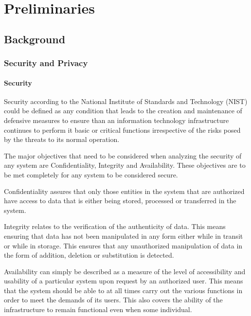 \chapter{Preliminaries}
\label{chap:preliminaries}

\section{Background}

\subsection{Security and Privacy}

\subsubsection*{Security}
Security according to the National Institute of Standards and Technology (NIST) \cite{Kissel2013} could be defined as any condition that leads to the creation and maintenance of defensive measures to ensure than an information technology infrastructure continues to perform it basic or critical functions irrespective of the risks posed by the threats to its normal operation.

The major objectives that need to be considered when analyzing the security of any system are Confidentiality, Integrity and Availability. These objectives are to be met completely for any system to be considered secure.

Confidentiality \cite{Kissel2013} assures that only those entities in the system that are authorized have access to data that is either being stored, processed or transferred in the system.

Integrity \cite{Kissel2013} relates to the verification of the authenticity of data. This means ensuring that data has not been manipulated in any form either while in transit or while in storage. This ensures that any unauthorized manipulation of data in the form of addition, deletion or substitution is detected.

Availability \cite{Kissel2013} can simply be described as a measure of the level of accessibility and usability of a particular system upon request by an authorized user. This means that the system should be able to at all times carry out the various functions in order to meet the demands of its users. This also covers the ability of the infrastructure to remain functional even when some individual.

